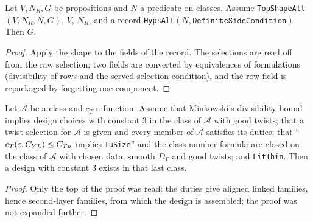 \begin{lemma}\label{fam:goal-of-shape}
Let $V,N_R,G$ be propositions and $N$ a predicate on classes. Assume \texttt{TopShapeAlt}$(V,N_R,N,G)$, $V$, $N_R$, and a record \texttt{HypsAlt}$(N,\texttt{DefiniteSideCondition})$. Then $G$.
\end{lemma}
\begin{proof}
Apply the shape to the fields of the record. The selections are read off from the raw selection; two fields are converted by equivalences of formulations (divisibility of rows and the served-selection condition), and the row field is repackaged by forgetting one component.
\end{proof}

\begin{lemma}\label{fam:design-exists}
Let $\mathcal A$ be a class and $c_T$ a function. Assume that Minkowski's divisibility bound implies design choices with constant $3$ in the class of $\mathcal A$ with good twists; that a twist selection for $\mathcal A$ is given and every member of $\mathcal A$ satisfies its duties; that ``$c_T(\varepsilon,C_{YL})\le C_{Tu}$ implies \texttt{TuSize}'' and the class number formula are closed on the class of $\mathcal A$ with chosen data, smooth $D_{\Gamma}$ and good twists; and \texttt{LitThin}. Then a design with constant $3$ exists in that last class.
\end{lemma}
\begin{proof}
Only the top of the proof was read: the duties give aligned linked families, hence second-layer families, from which the design is assembled; the proof was not expanded further.
\end{proof}

